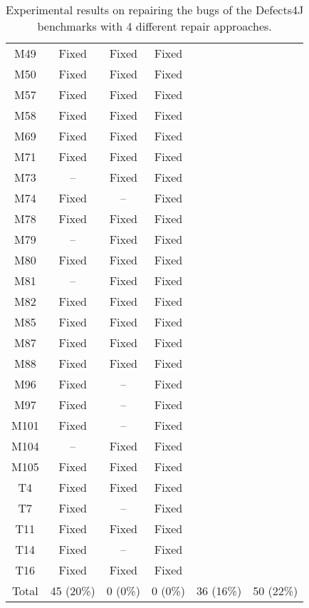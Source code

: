\begin{table}[!t]
{\begin{tabular}{|c|c|c|c|c|c|}
M49               & Fixed     & Fixed     &Fixed   \\
M50               & Fixed     & Fixed     &Fixed   \\
M57               & Fixed     & Fixed     &Fixed   \\
M58               & Fixed     & Fixed     &Fixed   \\
M69               & Fixed     & Fixed     &Fixed   \\
M71               & Fixed     & Fixed     &Fixed   \\
M73               & --        & Fixed     &Fixed   \\
M74               & Fixed     & --        &Fixed   \\
M78               & Fixed     & Fixed     &Fixed   \\
M79               & --        & Fixed     &Fixed   \\
M80               & Fixed     & Fixed     &Fixed   \\
M81               & --        & Fixed     &Fixed   \\
M82               & Fixed     & Fixed     &Fixed   \\
M85               & Fixed     & Fixed     &Fixed   \\
M87               & Fixed     & Fixed     &Fixed   \\
M88               & Fixed     & Fixed     &Fixed   \\
M96               & Fixed     & --        &Fixed   \\
M97               & Fixed     & --        &Fixed   \\
M101              & Fixed     & --        &Fixed   \\
M104              & --        & Fixed     &Fixed   \\
M105              & Fixed     & Fixed     &Fixed   \\
\hline
T4                & Fixed     & Fixed     &Fixed   \\
T7                & Fixed     & --        &Fixed   \\
T11               & Fixed     & Fixed     &Fixed   \\
T14               & Fixed     & --        &Fixed   \\
T16               & Fixed     & Fixed     &Fixed   \\
\hline
Total             & 45 (20\%) & 0 (0\%)   & 0 (0\%)   & 36 (16\%) & 50 (22\%)\\
\hline 
\end{tabular}%
}
\caption{Experimental results on repairing the bugs of the Defects4J benchmarks with 4 different repair approaches.}
\end{table}

